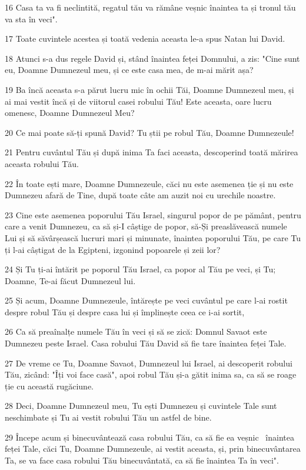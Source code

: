 \par 16 Casa ta va fi neclintită, regatul tău va rămâne veșnic înaintea ta și tronul tău va sta în veci".
\par 17 Toate cuvintele acestea și toată vedenia aceasta le-a spus Natan lui David.
\par 18 Atunci s-a dus regele David și, stând înaintea feței Domnului, a zis: "Cine sunt eu, Doamne Dumnezeul meu, și ce este casa mea, de m-ai mărit așa?
\par 19 Ba încă aceasta s-a părut lucru mic în ochii Tăi, Doamne Dumnezeul meu, și ai mai vestit încă și de viitorul casei robului Tău! Este aceasta, oare lucru omenesc, Doamne Dumnezeul Meu?
\par 20 Ce mai poate să-ți spună David? Tu știi pe robul Tău, Doamne Dumnezeule!
\par 21 Pentru cuvântul Tău și după inima Ta faci aceasta, descoperind toată mărirea aceasta robului Tău.
\par 22 În toate ești mare, Doamne Dumnezeule, căci nu este asemenea ție și nu este Dumnezeu afară de Tine, după toate câte am auzit noi cu urechile noastre.
\par 23 Cine este asemenea poporului Tău Israel, singurul popor de pe pământ, pentru care a venit Dumnezeu, ca să și-I câștige de popor, să-Și preaslăvească numele Lui și să săvârșească lucruri mari și minunate, înaintea poporului Tău, pe care Tu ți l-ai câștigat de la Egipteni, izgonind popoarele și zeii lor?
\par 24 Și Tu ți-ai întărit pe poporul Tău Israel, ca popor al Tău pe veci, și Tu; Doamne, Te-ai făcut Dumnezeul lui.
\par 25 Și acum, Doamne Dumnezeule, întărește pe veci cuvântul pe care l-ai rostit despre robul Tău și despre casa lui și împlinește ceea ce i-ai sortit,
\par 26 Ca să preaînalțe numele Tău în veci și să se zică: Domnul Savaot este Dumnezeu peste Israel. Casa robului Tău David să fie tare înaintea feței Tale.
\par 27 De vreme ce Tu, Doamne Savaot, Dumnezeul lui Israel, ai descoperit robului Tău, zicând: "Îți voi face casă", apoi robul Tău și-a gătit inima sa, ca să se roage ție cu această rugăciune.
\par 28 Deci, Doamne Dumnezeul meu, Tu ești Dumnezeu și cuvintele Tale sunt neschimbate și Tu ai vestit robului Tău un astfel de bine.
\par 29 Începe acum și binecuvântează casa robului Tău, ca să fie ea veșnic  înaintea feței Tale, căci Tu, Doamne Dumnezeule, ai vestit aceasta, și, prin binecuvântarea Ta, se va face casa robului Tău binecuvântată, ca să fie înaintea Ta în veci".

